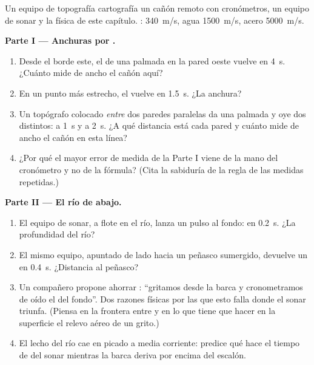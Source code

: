 \begin{problem}\label{pb:g7:sound-production:1}
Un equipo de topografía cartografía un cañón remoto con cronómetros,
un equipo de sonar y la física de este capítulo.
:  \qty{340}{m/s}, agua \qty{1500}{m/s}, acero
\qty{5000}{m/s}.

\medskip\noindent\textbf{Parte I --- Anchuras por .}
\begin{enumerate}
  \item Desde el borde este, el  de una palmada en la pared
        oeste vuelve en \qty{4}{s}. ¿Cuánto mide de ancho el cañón
        aquí?
  \item En un punto más estrecho, el  vuelve en \qty{1.5}{s}.
        ¿La anchura?
  \item Un topógrafo colocado \emph{entre} dos paredes paralelas da
        una palmada y oye dos  distintos: a \qty{1}{s} y a
        \qty{2}{s}. ¿A qué distancia está cada pared y cuánto mide
        de ancho el cañón en esta línea?
  \item ¿Por qué el mayor error de medida de la Parte I viene de la
        mano del cronómetro y no de la fórmula? (Cita la sabiduría
        de la regla de las medidas repetidas.)
\end{enumerate}

\medskip\noindent\textbf{Parte II --- El río de abajo.}
\begin{enumerate}[resume]
  \item El equipo de sonar, a flote en el río, lanza un pulso al
        fondo:  en \qty{0.2}{s}. ¿La profundidad del río?
  \item El mismo equipo, apuntado de lado hacia un peñasco
        sumergido, devuelve un  en \qty{0.4}{s}. ¿Distancia al
        peñasco?
  \item Un compañero propone ahorrar : ``gritamos desde la
        barca y cronometramos de oído el  del fondo''. Dos
        razones físicas por las que esto falla donde el sonar
        triunfa. (Piensa en la frontera entre  y en lo que
        tiene que hacer en la superficie el relevo aéreo de un
        grito.)
  \item El lecho del río cae en picado a media corriente: predice
        qué hace el tiempo de  del sonar mientras la barca
        deriva por encima del escalón.
\end{enumerate}


\end{problem}
